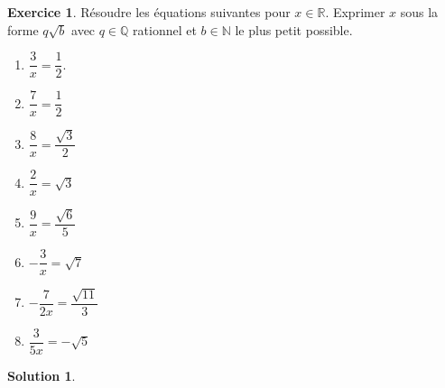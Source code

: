 \documentclass[a4paper, 14pt]{extarticle}
\theoremstyle{plain}
\newtheorem*{sol}{Solution}
\theoremstyle{definition}
\newtheorem{ex}{Exercice}
\newcommand{\R}{\mathbb{R}}
\newcommand{\N}{\mathbb{N}}
\newcommand{\Q}{\mathbb{Q}}
\newcommand{\exe}[2]{
		\begin{ex} #1  \end{ex}
		\begin{sol} #2 \end{sol}
	}
\newcommand{\exe}[2]{
		\begin{ex} #1  \end{ex}
	}
\begin{document}
\exe{
	Résoudre les équations suivantes pour $x\in\R$. Exprimer $x$ sous la forme $q \sqrt{b}$ avec $q\in\Q$ rationnel et $b\in\N$ le plus petit possible.
	\begin{multicols}{2}
	\begin{enumerate}
		\item $\dfrac3x = \dfrac12.$
		\item $ \dfrac7x  =\dfrac12$
		\item $\dfrac8x  =\dfrac{\sqrt{3}}2$
		\item $\dfrac2x =\sqrt{3}$
		\item $\dfrac9x  =\dfrac{\sqrt{6}}5$
		\item $-\dfrac3x =\sqrt{7}$
		\item $-\dfrac7{2x}  =\dfrac{\sqrt{11}}3$
		\item $\dfrac3{5x} =-\sqrt{5}$
	\end{enumerate}
	\end{multicols}
}{}
\end{document}
